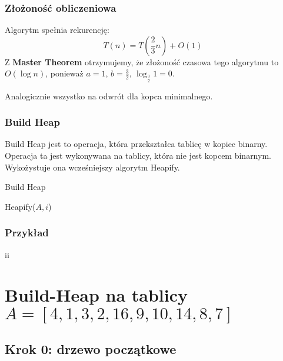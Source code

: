\documentclass[11pt,a4paper]{article}
\begin{document}
\subsubsection*{Złożoność obliczeniowa}
Algorytm spełnia rekurencję:
\[
    T(n) = T\left(\frac{2}{3}n\right) + O(1)
\]
Z \textbf{Master Theorem} otrzymujemy, że złożoność czasowa tego algorytmu to $O(\log n)$, ponieważ $a=1$, $b=\frac{3}{2}$, $\log_{\frac{3}{2}}1=0$.

Analogicznie wszystko na odwrót dla kopca minimalnego.

\subsubsection{Build Heap}
Build Heap jest to operacja, która przekształca tablicę w kopiec binarny. Operacja ta jest wykonywana na tablicy, która nie jest kopcem binarnym. Wykożystuje ona wcześniejszy algorytm Heapify.
\begin{center}
    \begin{algorithm}
        \caption{Build Heap}
        \begin{algorithmic}[1]
                    \State Heapify($A, i$)
                \EndFor
            \EndProcedure
        \end{algorithmic}
    \end{algorithm}
\end{center}
\subsubsection{Przykład}
ii
\section*{Build-Heap na tablicy $A=[4,1,3,2,16,9,10,14,8,7]$}

\subsection*{Krok 0: drzewo początkowe}
\begin{center}\end{center}
\end{document}
